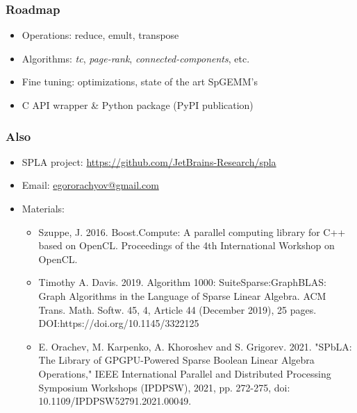 \documentclass[aspectratio=169,xcolor=table,english]{beamer}
\begin{document}
\begin{frame}[fragile] \frametitle{Roadmap}
    \begin{itemize}
        \item Operations: reduce, emult, transpose
        \item Algorithms: \textit{tc}, \textit{page-rank}, \textit{connected-components}, etc.
        \item Fine tuning: optimizations, state of the art SpGEMM's
        \item C API wrapper \& Python package (PyPI publication)
    \end{itemize}
\end{frame}

\begin{frame} \frametitle{Also}
    \begin{itemize}
        \item SPLA project: \href{https://github.com/JetBrains-Research/cuBool}{https://github.com/JetBrains-Research/spla}
        \item Email: \href{mailto:egororachyov@gmail.com}{egororachyov@gmail.com}
        \item Materials:
        {
            \begin{itemize}
                \item Szuppe, J. 2016. Boost.Compute: A parallel computing library for C++ based on OpenCL. Proceedings of the 4th International Workshop on OpenCL.
                \item Timothy A. Davis. 2019. Algorithm 1000: SuiteSparse:GraphBLAS: Graph Algorithms in the Language of Sparse Linear Algebra. ACM Trans. Math. Softw. 45, 4, Article 44 (December 2019), 25 pages. DOI:https://doi.org/10.1145/3322125
                \item E. Orachev, M. Karpenko, A. Khoroshev and S. Grigorev. 2021. "SPbLA: The Library of GPGPU-Powered Sparse Boolean Linear Algebra Operations," IEEE International Parallel and Distributed Processing Symposium Workshops (IPDPSW), 2021, pp. 272-275, doi: 10.1109/IPDPSW52791.2021.00049.
            \end{itemize}
        }
    \end{itemize}
\end{frame}
\end{document}
